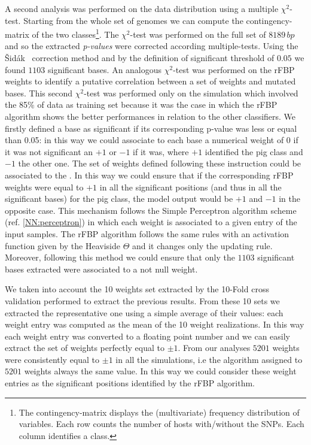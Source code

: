 \documentclass{standalone}
\begin{document}
A second analysis was performed on the data distribution using a multiple $\chi^2$-test.
Starting from the whole set of genomes we can compute the contingency-matrix of the two classes\footnote{
  The contingency-matrix displays the (multivariate) frequency distribution of variables.
  Each row counts the number of hosts with/without the SNPs.
  Each column identifies a class.
}.
The $\chi^2$-test was performed on the full set of $8189\,bp$ and so the extracted \emph{p-values} were corrected according multiple-tests.
Using the \v{S}id\'ak~\cite{Sidak1967} correction method and by the definition of significant threshold of $0.05$ we found $1103$ significant bases.
An analogous $\chi^2$-test was performed on the rFBP weights to identify a putative correlation between a set of weights and mutated bases.
This second $\chi^2$-test was performed only on the simulation which involved the 85\% of data as training set because it was the case in which the rFBP algorithm shows the better performances in relation to the other classifiers.
We firstly defined a base as significant if its corresponding p-value was less or equal than 0.05: in this way we could associate to each base a numerical weight of 0 if it was not significant an $+1$ or $-1$ if it was, where $+1$ identified the pig class and $-1$ the other one.
The set of weights defined following these instruction could be associated to the .
In this way we could ensure that if the corresponding rFBP weights were equal to $+1$ in all the significant positions (and thus in all the significant bases) for the pig class, the model output would be $+1$ and $-1$ in the opposite case.
This mechanism follows the Simple Perceptron algorithm scheme (ref. \ref{NN:perceptron}) in which each weight is associated to a given entry of the input samples.
The rFBP algorithm follows the same rules with an activation function given by the Heaviside $\Theta$ and it changes only the updating rule.
Moreover, following this method we could ensure that only the $1103$ significant bases extracted were associated to a not null weight.

We taken into account the 10 weights set extracted by the 10-Fold cross validation performed to extract the previous results.
From these 10 sets we extracted the representative one using a simple average of their values: each weight entry was computed as the mean of the 10 weight realizations.
In this way each weight entry was converted to a floating point number and we can easily extract the set of weights perfectly equal to $\pm1$.
From our analyses $5201$ weights were consistently equal to $\pm1$ in all the simulations, i.e the algorithm assigned to $5201$ weights always the same value.
In this way we could consider these weight entries as the significant positions identified by the rFBP algorithm.
\end{document}
